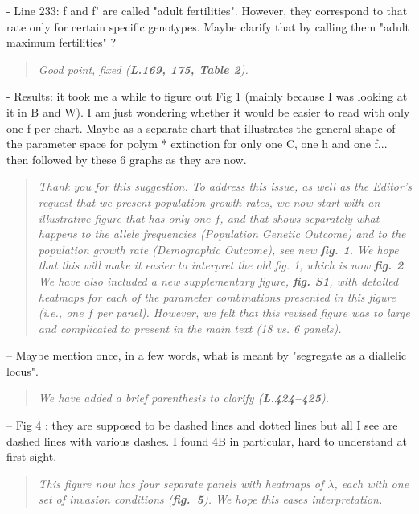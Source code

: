 \documentclass[11pt]{article}
\begin{document}
- Line 233: f and f’ are called "adult fertilities". However, they correspond to that rate only for certain specific genotypes. Maybe clarify that by calling them "adult maximum fertilities" ?

\begin{quote}
	{\itshape Good point, fixed ({\bf L.169, 175, Table 2}).}
\end{quote}

- Results: it took me a while to figure out Fig 1 (mainly because I was looking at it in B and W). I am just wondering whether it would be easier to read with only one f per chart. Maybe as a separate chart that illustrates the general shape of the parameter space for polym * extinction for only one C, one h and one f... then followed by these 6 graphs as they are now.

\begin{quote}
	{\itshape Thank you for this suggestion. To address this issue, as well as the Editor's request that we present population growth rates, we now start with an illustrative figure that has only one $f$, and that shows separately what happens to the allele frequencies (Population Genetic Outcome) and to the population growth rate (Demographic Outcome), see new {\bf fig. 1}. We hope that this will make it easier to interpret the old fig. 1, which is now {\bf fig. 2}. We have also included a new supplementary figure, {\bf fig. S1}, with detailed heatmaps for each of the parameter combinations presented in this figure (i.e., one $f$ per panel). However, we felt that this revised figure was to large and complicated to present in the main text (18 vs. 6 panels).}
\end{quote}

\noindent-- Maybe mention once, in a few words, what is meant by "segregate as a diallelic locus".
\begin{quote}
	{\itshape We have added a brief parenthesis to clarify ({\bf L.424--425}).}
\end{quote}

\noindent-- Fig 4 : they are supposed to be dashed lines and dotted lines but all I see are dashed lines with various dashes. I found 4B in particular, hard to understand at first sight.

\begin{quote}
	{\itshape This figure now has four separate panels with heatmaps of $\lambda$, each with one set of invasion conditions ({\bf fig.~5}). We hope this eases interpretation.}
\end{quote}
\bigskip
\end{document}
